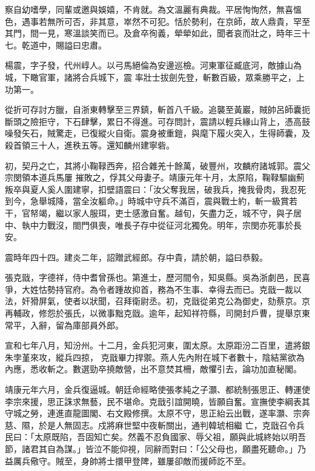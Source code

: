 \begin{pinyinscope}
 察自幼嗜學，同輩或邀與娛嬉，不肯就。為文溫麗有典裁。平居恂恂然，無喜慍色，遇事若無所可否，非其意，崒然不可犯。恬於勢利，在京師，故人鼎貴，罕至其門，間一見，寒溫談笑而已。及倉卒徇義，犖犖如此，聞者哀而壯之，時年三十七。乾道中，賜謚曰忠肅。



 楊震，字子發，代州崞人。以弓馬絕倫為安邊巡檢。河東軍征臧底河，敵據山為城，下瞰官軍，諸將合兵城下，震
 率壯士拔劍先登，斬數百級，眾乘勝平之，上功第一。



 從折可存討方臘，自浙東轉擊至三界鎮，斬首八千級。追襲至黃巖，賊帥呂師囊扼斷頭之險拒守，下石肆擊，累日不得進。可存問計，震請以輕兵緣山背上，憑高鼓噪發矢石，賊驚走，已復縱火自衛。震身被重鎧，與麾下履火突入，生得師囊，及殺首領三十人，進秩五等。還知麟州建寧砦。



 初，契丹之亡，其將小鞠䩮西奔，招合雜羌十餘萬，破豐州，攻麟府諸城郭。震父宗閔領本道兵馬屢
 摧敗之，俘其父母妻子。靖康元年十月，太原陷，鞠䩮驅幽薊叛卒與夏人奚人圍建寧，扣壁語震曰：「汝父奪我居，破我兵，掩我骨肉，我忍死到今，急舉城降，當全汝軀命。」時城中守兵不滿百，震與戰士約，斬一級賞若干，官帑竭，繼以家人服珥，吏士感激自奮。越旬，矢盡力乏，城不守，與子居中、執中力戰沒，閤門俱喪，唯長子存中從征河北獨免。明年，宗閔亦死事於長安。



 震時年四十四。建炎二年，詔贈武經郎。存中貴，請於朝，謚曰恭毅。



 張克戩，字德祥，侍中耆曾孫也。第進士，歷河間令，知吳縣。吳為浙劇邑，民喜爭，大姓怙勢持官府。為令者踵故抑首，務為不生事、幸得去而已。克戩一裁以法，奸猾屏氣，使者以狀聞，召拜衛尉丞。初，克戩從弟克公為御史，劾蔡京。京再輔政，修怨於張氏，以微事黜克戩。逾年，起知祥符縣，司開封戶曹，提舉京東常平，入辭，留為庫部員外郎。



 宣和七年八月，知汾州。十二月，金兵犯河東，圍太原。太原距汾二百里，遣將銀朱孛堇來攻，縱兵四掠，
 克戩畢力捍禦。燕人先內附在城下者數十，陰結黨欲為內應，悉收斬之。數選勁卒撓敵營，出不意焚其柵，敵懼引去，論功加直秘閣。



 靖康元年六月，金兵復逼城。朝廷命經略使張孝純之子灝、都統制張思正、轉運使李宗來援，思正誅求無藝，民不堪命。克戩引誼開曉，皆願自奮。宣撫使李綱表其守城之勞，連進直龍圖閣、右文殿修撰。太原不守，思正紿云出戰，遂率灝、宗奔慈、隰，於是人無固志。戍將麻世堅中夜斬關出，通判韓琥相繼
 亡，克戩召令兵民曰：「太原既陷，吾固知亡矣。然義不忍負國家、辱父祖，願與此城終始以明吾節，諸君其自為謀。」皆泣不能仰視，同辭而對曰：「公父母也，願盡死聽命。」乃益厲兵儆守。賊至，身帥將士擐甲登陴，雖屢卻敵而援師訖不至。




\end{pinyinscope}
